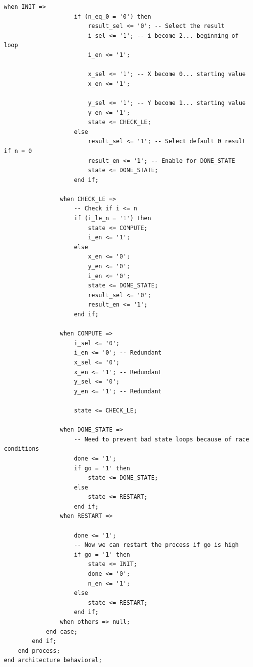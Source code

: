 \documentclass{article}
\begin{document}
\begin{lstlisting}[caption=One Process FSM VHDL Code, label=lst:one-process-fsm-vhdl-code]
                when INIT =>
                    if (n_eq_0 = '0') then
                        result_sel <= '0'; -- Select the result
                        i_sel <= '1'; -- i become 2... beginning of loop
                        i_en <= '1';

                        x_sel <= '1'; -- X become 0... starting value
                        x_en <= '1';

                        y_sel <= '1'; -- Y become 1... starting value
                        y_en <= '1';
                        state <= CHECK_LE;
                    else
                        result_sel <= '1'; -- Select default 0 result if n = 0
						result_en <= '1'; -- Enable for DONE_STATE
                        state <= DONE_STATE;
                    end if;

                when CHECK_LE =>
                    -- Check if i <= n
                    if (i_le_n = '1') then
                        state <= COMPUTE;
						i_en <= '1';
                    else
                        x_en <= '0';
                        y_en <= '0';
                        i_en <= '0';
                        state <= DONE_STATE;
						result_sel <= '0';
						result_en <= '1';
                    end if;
                
                when COMPUTE =>
                    i_sel <= '0';
                    i_en <= '0'; -- Redundant
                    x_sel <= '0';
                    x_en <= '1'; -- Redundant
                    y_sel <= '0';
                    y_en <= '1'; -- Redundant

                    state <= CHECK_LE;

                when DONE_STATE =>
                    -- Need to prevent bad state loops because of race conditions
                    done <= '1';
                    if go = '1' then
                        state <= DONE_STATE;
                    else
                        state <= RESTART;
                    end if;
                when RESTART =>
 
                    done <= '1';
                    -- Now we can restart the process if go is high
                    if go = '1' then
                        state <= INIT;
						done <= '0';
						n_en <= '1';
                    else
                        state <= RESTART;
                    end if;
                when others => null;
            end case;
        end if;
    end process;
end architecture behavioral;
\end{lstlisting}
\end{document}
